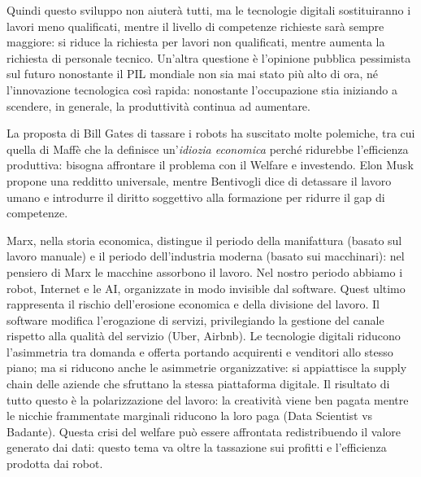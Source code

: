 \documentclass[a4page, 11pt]{article}
\begin{document}

Quindi questo sviluppo non aiuterà tutti, ma le tecnologie digitali sostituiranno i lavori meno qualificati, mentre il livello di competenze richieste sarà sempre maggiore: si riduce la richiesta per lavori non qualificati, mentre aumenta la richiesta di personale tecnico.
Un'altra questione è l'opinione pubblica pessimista sul futuro nonostante il PIL mondiale non sia mai stato più alto di ora, né l'innovazione tecnologica così rapida: nonostante l'occupazione stia iniziando a scendere, in generale, la produttività continua ad aumentare.

La proposta di Bill Gates di tassare i robots ha suscitato molte polemiche, tra cui quella di Maffè che la definisce un'\textit{idiozia economica} perché ridurebbe l'efficienza produttiva: bisogna affrontare il problema con il Welfare e investendo.
Elon Musk propone una redditto universale, mentre Bentivogli dice di detassare il lavoro umano e introdurre il diritto soggettivo alla formazione per ridurre il gap di competenze.

Marx, nella storia economica, distingue il periodo della manifattura (basato sul lavoro manuale) e il periodo dell'industria moderna (basato sui macchinari): nel pensiero di Marx le macchine assorbono il lavoro.
Nel nostro periodo abbiamo i robot, Internet e le AI, organizzate in modo invisible dal software.
Quest ultimo rappresenta il rischio dell'erosione economica e della divisione del lavoro.
Il software modifica l'erogazione di servizi, privilegiando la gestione del canale rispetto alla qualità del servizio (Uber, Airbnb).
Le tecnologie digitali riducono l'asimmetria tra domanda e offerta portando acquirenti e venditori allo stesso piano; ma si riducono anche le asimmetrie organizzative: si appiattisce la supply chain delle aziende che sfruttano la stessa piattaforma digitale.
Il risultato di tutto questo è la polarizzazione del lavoro: la creatività viene ben pagata mentre le nicchie frammentate marginali riducono la loro paga (Data Scientist vs Badante).
Questa crisi del welfare può essere affrontata redistribuendo il valore generato dai dati: questo tema va oltre la tassazione sui profitti e l'efficienza prodotta dai robot.
\end{document}
